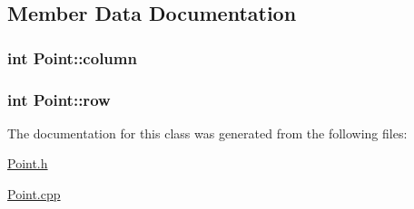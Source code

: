 \subsection{Member Data Documentation}
\hypertarget{classPoint_a08041071ec0b92b604e5f56c0ed47e44}{
\subsubsection[{column}]{\setlength{\rightskip}{0pt plus 5cm}int {\bf Point::column}}}
\label{classPoint_a08041071ec0b92b604e5f56c0ed47e44}
\hypertarget{classPoint_a23c0e7e187fad47e1524872d44841908}{
\subsubsection[{row}]{\setlength{\rightskip}{0pt plus 5cm}int {\bf Point::row}}}
\label{classPoint_a23c0e7e187fad47e1524872d44841908}


The documentation for this class was generated from the following files:\begin{DoxyCompactItemize}
\item 
\hyperlink{Point_8h}{Point.h}\item 
\hyperlink{Point_8cpp}{Point.cpp}\end{DoxyCompactItemize}
